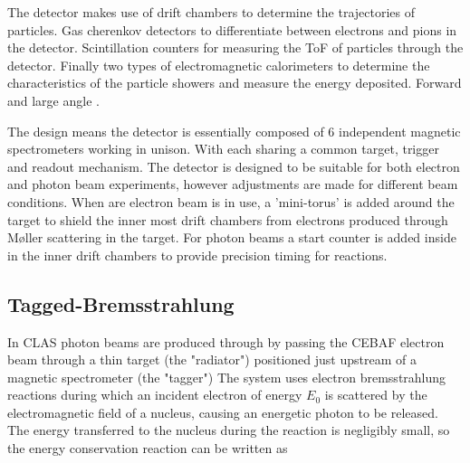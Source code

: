 The detector makes use of drift chambers to determine the trajectories of particles. \cite{mestayer2000clas} Gas cherenkov detectors to differentiate between electrons and pions in the detector. \cite{adams2001clas} Scintillation counters for measuring the ToF of particles through the detector. \cite{smith1999time} Finally two types of electromagnetic calorimeters to determine the characteristics of the particle showers and measure the energy deposited. Forward \cite{amarian2001clas} and large angle \cite{anghinolfi2000response}.

The design means the detector is essentially composed of 6 independent magnetic spectrometers working in unison. With each sharing a common target, trigger and readout mechanism. The detector is designed to be suitable for both electron and photon beam experiments, however adjustments are made for different beam conditions. When are electron beam is in use, a 'mini-torus' is added around the target to shield the inner most drift chambers from electrons produced through M\o{}ller scattering in the target. For photon beams a start counter is added inside in the inner drift chambers to provide precision timing for reactions. \cite{taylor2001clas}


%
%
%
%

%

\subsection{Tagged-Bremsstrahlung}

In CLAS photon beams are produced through by passing the CEBAF electron beam through a thin target (the "radiator") positioned just upstream of a magnetic spectrometer (the "tagger") The system uses electron bremsstrahlung reactions during which an incident electron of energy $E_{0}$ is scattered by the electromagnetic field of a nucleus, causing an energetic photon to be released. The energy transferred to the nucleus during the reaction is negligibly small, so the energy conservation reaction can be written as

